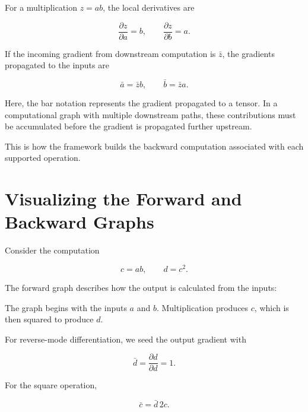 For a multiplication \(z=ab\), the local derivatives are

\[
\frac{\partial z}{\partial a}=b,
\qquad
\frac{\partial z}{\partial b}=a.
\]

If the incoming gradient from downstream computation is \(\bar{z}\), the gradients propagated to the inputs are

\[
\bar{a}=\bar{z}b,
\qquad
\bar{b}=\bar{z}a.
\]

Here, the bar notation represents the gradient propagated to a tensor. In a computational graph with multiple downstream paths, these contributions must be accumulated before the gradient is propagated further upstream.

This is how the framework builds the backward computation associated with each supported operation.

\section{Visualizing the Forward and Backward Graphs}

Consider the computation

\[
c = a b,
\qquad
d = c^2.
\]

The forward graph describes how the output is calculated from the inputs:

\begin{center}
\end{center}

The graph begins with the inputs \(a\) and \(b\). Multiplication produces \(c\), which is then squared to produce \(d\).

For reverse-mode differentiation, we seed the output gradient with

\[
\bar{d}=\frac{\partial d}{\partial d}=1.
\]

For the square operation,

\[
\bar{c}=\bar{d}\,2c.
\]

